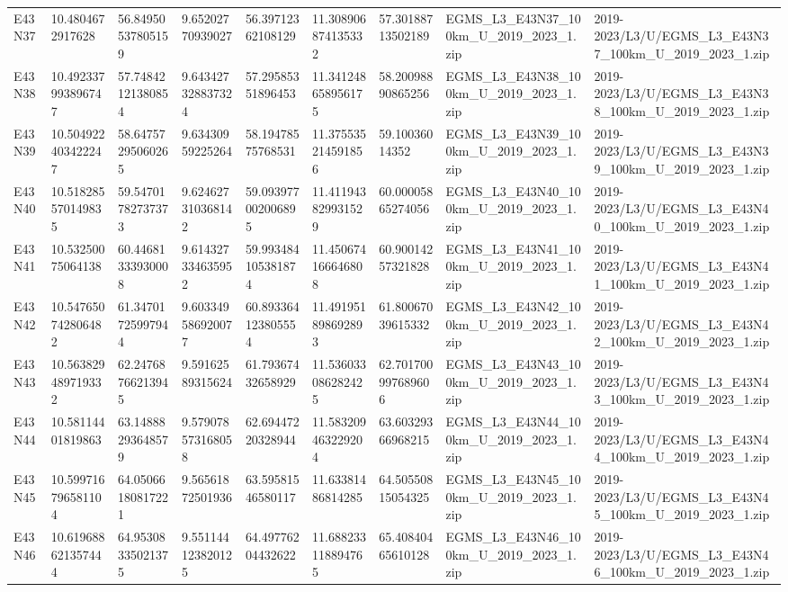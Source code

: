 \begin{landscape}
\begin{longtable}{lllllllll}
E43N37 & 10.4804672917628 & 56.84950537805159 & 9.65202770939027 & 56.39712362108129 & 11.308906874135332 & 57.30188713502189 & EGMS\_L3\_E43N37\_100km\_U\_2019\_2023\_1.zip & 2019-2023/L3/U/EGMS\_L3\_E43N37\_100km\_U\_2019\_2023\_1.zip \\
E43N38 & 10.492337993896747 & 57.74842121380854 & 9.643427328837324 & 57.29585351896453 & 11.341248658956175 & 58.20098890865256 & EGMS\_L3\_E43N38\_100km\_U\_2019\_2023\_1.zip & 2019-2023/L3/U/EGMS\_L3\_E43N38\_100km\_U\_2019\_2023\_1.zip \\
E43N39 & 10.504922403422247 & 58.64757295060265 & 9.63430959225264 & 58.19478575768531 & 11.375535214591856 & 59.10036014352 & EGMS\_L3\_E43N39\_100km\_U\_2019\_2023\_1.zip & 2019-2023/L3/U/EGMS\_L3\_E43N39\_100km\_U\_2019\_2023\_1.zip \\
E43N40 & 10.518285570149835 & 59.54701782737373 & 9.624627310368142 & 59.093977002006895 & 11.411943829931529 & 60.00005865274056 & EGMS\_L3\_E43N40\_100km\_U\_2019\_2023\_1.zip & 2019-2023/L3/U/EGMS\_L3\_E43N40\_100km\_U\_2019\_2023\_1.zip \\
E43N41 & 10.53250075064138 & 60.44681333930008 & 9.614327334635952 & 59.993484105381874 & 11.450674166646808 & 60.90014257321828 & EGMS\_L3\_E43N41\_100km\_U\_2019\_2023\_1.zip & 2019-2023/L3/U/EGMS\_L3\_E43N41\_100km\_U\_2019\_2023\_1.zip \\
E43N42 & 10.547650742806482 & 61.34701725997944 & 9.603349586920077 & 60.893364123805554 & 11.491951898692893 & 61.80067039615332 & EGMS\_L3\_E43N42\_100km\_U\_2019\_2023\_1.zip & 2019-2023/L3/U/EGMS\_L3\_E43N42\_100km\_U\_2019\_2023\_1.zip \\
E43N43 & 10.563829489719332 & 62.24768766213945 & 9.59162589315624 & 61.79367432658929 & 11.536033086282425 & 62.701700997689606 & EGMS\_L3\_E43N43\_100km\_U\_2019\_2023\_1.zip & 2019-2023/L3/U/EGMS\_L3\_E43N43\_100km\_U\_2019\_2023\_1.zip \\
E43N44 & 10.58114401819863 & 63.14888293648579 & 9.579078573168058 & 62.69447220328944 & 11.583209463229204 & 63.60329366968215 & EGMS\_L3\_E43N44\_100km\_U\_2019\_2023\_1.zip & 2019-2023/L3/U/EGMS\_L3\_E43N44\_100km\_U\_2019\_2023\_1.zip \\
E43N45 & 10.599716796581104 & 64.05066180817221 & 9.56561872501936 & 63.59581546580117 & 11.63381486814285 & 64.50550815054325 & EGMS\_L3\_E43N45\_100km\_U\_2019\_2023\_1.zip & 2019-2023/L3/U/EGMS\_L3\_E43N45\_100km\_U\_2019\_2023\_1.zip \\
E43N46 & 10.619688621357444 & 64.95308335021375 & 9.551144123820125 & 64.49776204432622 & 11.688233118894765 & 65.40840465610128 & EGMS\_L3\_E43N46\_100km\_U\_2019\_2023\_1.zip & 2019-2023/L3/U/EGMS\_L3\_E43N46\_100km\_U\_2019\_2023\_1.zip \\

\end{longtable}
\end{landscape}

